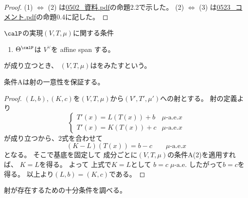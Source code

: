 \documentclass[report]{jlreq}
\begin{document}
\begin{proof}
    (1) $\iff$ (2) は\url{0502_資料.pdf}の命題2.2で示した。
    (2) $\iff$ (3) は\url{0523_コメント.pdf}の命題0.4に記した。
\end{proof}

\begin{definition}[条件B]
    $\calP$の実現$(V, T, \mu)$に関する条件
    \begin{enumerate}
        \item $\Theta^\calP$は
            $V^\vee$を affine span する。
    \end{enumerate}
    が成り立つとき、
    $(V, T, \mu)$はをみたすという。
\end{definition}

条件Aは射の一意性を保証する。


\begin{proof}
    $(L, b), (K, c)$を$(V, T, \mu)$から$(V', T', \mu')$への射とする。
    射の定義より
    \begin{equation}
        \begin{cases}
            T'(x) = L(T(x)) + b & \text{$\mu$-a.e.$x$} \\
            T'(x) = K(T(x)) + c & \text{$\mu$-a.e.$x$}
        \end{cases}
    \end{equation}
    が成り立つから、2式を合わせて
    \begin{equation}
        (K - L)(T(x)) = b - c \qquad \text{$\mu$-a.e.$x$}
    \end{equation}
    となる。
    そこで基底を固定して
    成分ごとに$(V, T, \mu)$の条件A(2)を適用すれば、
    $K = L$を得る。
    よって
    上式で$K = L$として
    $b = c \; \text{$\mu$-a.e.}$
    したがって$b = c$を得る。
    以上より$(L, b) = (K, c)$である。
\end{proof}

射が存在するための十分条件を調べる。

\end{document}
